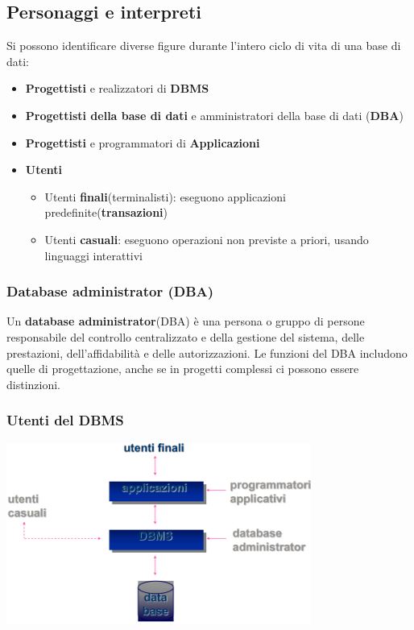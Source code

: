 \documentclass[12pt]{article}
\begin{document}
\subsection{Personaggi e interpreti}
Si possono identificare diverse figure durante l'intero ciclo di vita di una base di dati:
\begin{itemize}
    \item \textbf{Progettisti} e realizzatori di \textbf{DBMS}
    \item \textbf{Progettisti della base di dati} e amministratori della base di dati (\textbf{DBA})
    \item \textbf{Progettisti} e programmatori di \textbf{Applicazioni}
    \item \textbf{Utenti}
    \begin{itemize}
        \item Utenti \textbf{finali}(terminalisti): eseguono applicazioni predefinite(\textbf{transazioni})
        \item Utenti \textbf{casuali}: eseguono operazioni non previste a priori, usando linguaggi interattivi
    \end{itemize}
\end{itemize}
\subsubsection{Database administrator (DBA)}
Un \textbf{database administrator}(DBA) è una persona o gruppo di persone responsabile del controllo centralizzato e della gestione del sistema, delle prestazioni, dell'affidabilità e delle autorizzazioni.
Le funzioni del DBA includono quelle di progettazione, anche se in progetti complessi ci possono essere distinzioni.
\subsubsection{Utenti del DBMS}
\begin{center}
    \includegraphics[width = 0.75\textwidth]{Images/10.PNG}
\end{center}
\end{document}

